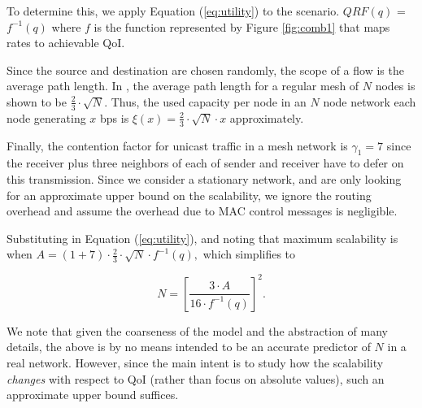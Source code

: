 To determine this, we apply Equation (\ref{eq:utility}) to the scenario.
$QRF(q)$ = $f^{-1}(q)$ where $f$ is the function represented by Figure
\ref{fig:comb1} that maps rates to achievable QoI.

Since the source and destination are chosen randomly, the scope of a flow is
the average path length. In \cite{Silv83}, the average path length for a
regular mesh of $N$ nodes is shown to be
$\frac{2}{3}\cdot \sqrt{N}$. Thus, the used capacity per node
in an $N$ node network each node generating $x$ bps
is $\xi(x) = \frac{2}{3}\cdot \sqrt{N}\cdot
x$ approximately.

Finally, the contention factor for unicast traffic in a mesh network
is $\gamma_1 = 7$ since the receiver
plus three neighbors of each of sender and receiver
 have to defer on this transmission. Since we
consider a stationary network, and are only looking for an approximate
upper bound on the scalability, we ignore the routing overhead and
assume the overhead due to MAC control messages is negligible.



Substituting  in Equation (\ref{eq:utility}), and noting that maximum
scalability is when %
$
A = (1+7)\cdot \frac{2}{3}\cdot  \sqrt{N}\cdot  f^{-1}(q),
$
which simplifies to

\begin{equation}
N = [\frac{3\cdot A}{16\cdot f^{-1}(q)}]^2.
\end{equation}

We note that given the coarseness of the model and the abstraction of many
details, the above is by no means intended to be an accurate predictor of
$N$ in a real network. However, since the main intent is to study how
the scalability {\em changes}
with respect to QoI (rather than focus on absolute values),
such an approximate upper bound suffices.



